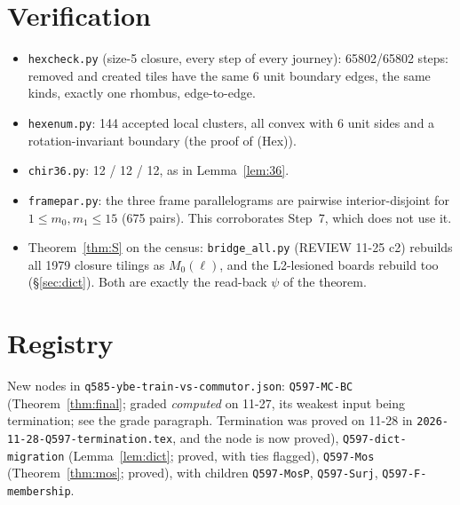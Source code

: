 \documentclass[11pt]{article}
\theoremstyle{definition}\newtheorem{definition}[theorem]{Definition}\newtheorem{remark}[theorem]{Remark}
\begin{document}
\section{Verification}\label{sec:ver}
\begin{itemize}
\item \texttt{hexcheck.py} (size-5 closure, every step of every journey): 65802/65802 steps: removed and created tiles have the same 6 unit boundary edges, the same kinds, exactly one rhombus, edge-to-edge.
\item \texttt{hexenum.py}: 144 accepted local clusters, all convex with 6 unit sides and a rotation-invariant boundary (the proof of (Hex)).
\item \texttt{chir36.py}: 12 / 12 / 12, as in Lemma~\ref{lem:36}.
\item \texttt{framepar.py}: the three frame parallelograms are pairwise interior-disjoint for $1\le m_0,m_1\le15$ (675 pairs). This corroborates Step~7, which does not use it.
\item Theorem~\ref{thm:S} on the census: \texttt{bridge\_all.py} (REVIEW 11-25 c2) rebuilds all 1979 closure tilings as $M_0(\ell)$, and the L2-lesioned boards rebuild too (\S\ref{sec:dict}). Both are exactly the read-back $\psi$ of the theorem.
\end{itemize}

\section{Registry}\label{sec:reg}
New nodes in \texttt{q585-ybe-train-vs-commutor.json}: \texttt{Q597-MC-BC} (Theorem~\ref{thm:final}; graded \emph{computed} on 11-27, its weakest input being termination; see the grade paragraph. Termination was proved on 11-28 in \texttt{2026-11-28-Q597-termination.tex}, and the node is now proved), \texttt{Q597-dict-migration} (Lemma~\ref{lem:dict}; proved, with ties flagged), \texttt{Q597-Mos} (Theorem~\ref{thm:mos}; proved), with children \texttt{Q597-MosP}, \texttt{Q597-Surj}, \texttt{Q597-F-membership}.
\end{document}
